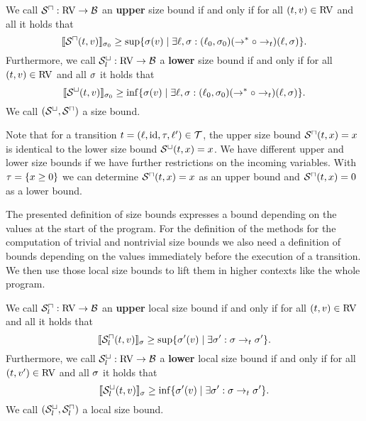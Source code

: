\begin{definition}
  We call ${\mathcal{S}^\sqcap}: \text{RV} \rightarrow \mathcal{B}$ an \textbf{upper} size bound if and only if for all $(t, v) \in \text{RV}$ and all  it holds that
  \[ \llbracket {\mathcal{S}^\sqcap}(t, v) \rrbracket_{\sigma_0} \geq \sup \lbrace \sigma(v) \mid \exists \ell, \sigma: (\ell_0, \sigma_0) (\rightarrow^* \circ \rightarrow_t) (\ell, \sigma) \rbrace. \]
  Furthermore, we call ${\mathcal{S}^\sqcup_l}: \text{RV} \rightarrow \mathcal{B}$ a \textbf{lower} size bound if and only if for all $(t, v) \in \text{RV}$ and all $\sigma$ it holds that
  \[ \llbracket {\mathcal{S}^\sqcup}(t, v) \rrbracket_{\sigma_0} \geq \inf \lbrace \sigma(v) \mid \exists \ell, \sigma: (\ell_0, \sigma_0) (\rightarrow^* \circ \rightarrow_t) (\ell, \sigma) \rbrace. \]
  We call ${({\mathcal{S}^\sqcup}, {\mathcal{S}^\sqcap})}$ a size bound.
\end{definition}

Note that for a transition $t = (\ell,\text{id},\tau,\ell') \in \mathcal{T}$, the upper size bound ${\mathcal{S}^\sqcap}(t,x) = x$ is identical to the lower size bound ${\mathcal{S}^\sqcup}(t,x) = x$.
We have different upper and lower size bounds if we have further restrictions on the incoming variables.
With $\tau = \lbrace x \geq 0 \rbrace$ we can determine ${\mathcal{S}^\sqcap}(t,x) = x$ as an upper bound and ${\mathcal{S}^\sqcap}(t,x) = 0$ as a lower bound.

The presented definition of size bounds expresses a bound depending on the values at the start of the program.
For the definition of the methods for the computation of trivial and nontrivial size bounds we also need a definition of bounds depending on the values immediately before the execution of a transition.
We then use those local size bounds to lift them in higher contexts like the whole program.

\begin{definition}
  We call ${\mathcal{S}^\sqcap_l}: \text{RV} \rightarrow \mathcal{B}$ an \textbf{upper} local size bound if and only if for all $(t, v) \in \text{RV}$ and all  it holds that
  \[ \llbracket {\mathcal{S}^\sqcap_l}(t, v) \rrbracket_{\sigma} \geq \sup \lbrace \sigma'(v) \mid \exists \sigma': \sigma \rightarrow_t \sigma' \rbrace. \]
  Furthermore, we call ${\mathcal{S}^\sqcup_l}: \text{RV} \rightarrow \mathcal{B}$ a \textbf{lower} local size bound if and only if for all $(t, v') \in \text{RV}$ and all $\sigma$ it holds that
  \[ \llbracket {\mathcal{S}^\sqcup_l}(t, v) \rrbracket_{\sigma} \geq \inf \lbrace \sigma'(v) \mid \exists \sigma': \sigma \rightarrow_t \sigma' \rbrace. \]
  We call ${({\mathcal{S}^\sqcup_l}, {\mathcal{S}^\sqcap_l})}$ a local size bound.
\end{definition}

